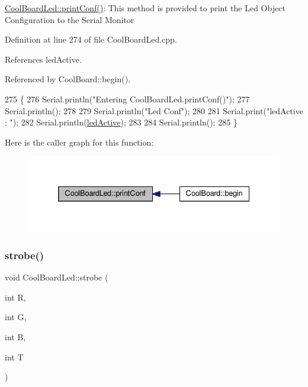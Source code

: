 \hyperlink{classCoolBoardLed_a8ed3053a36f0ed4a131f43b5b17efb61}{Cool\+Board\+Led\+::print\+Conf()}\+: This method is provided to print the Led Object Configuration to the Serial Monitor 

Definition at line 274 of file Cool\+Board\+Led.\+cpp.



References led\+Active.



Referenced by Cool\+Board\+::begin().


\begin{DoxyCode}
275 \{
276     Serial.println(\textcolor{stringliteral}{"Entering CoolBoardLed.printConf()"});
277     Serial.println();
278 
279     Serial.println(\textcolor{stringliteral}{"Led Conf"});
280 
281     Serial.print(\textcolor{stringliteral}{"ledActive : "});
282     Serial.println(\hyperlink{classCoolBoardLed_a5f17c135516fcf4b44ea8a096ba0177a}{ledActive});
283 
284     Serial.println();   
285 \}
\end{DoxyCode}
Here is the caller graph for this function\+:\nopagebreak
\begin{figure}[H]
\begin{center}
\leavevmode
\includegraphics[width=332pt]{classCoolBoardLed_a8ed3053a36f0ed4a131f43b5b17efb61_icgraph}
\end{center}
\end{figure}
\mbox{\label{classCoolBoardLed_adc08c0ac07473499971c503d300f0413}} 
\subsubsection{\texorpdfstring{strobe()}{strobe()}}
{\footnotesize\ttfamily void Cool\+Board\+Led\+::strobe (\begin{DoxyParamCaption}\item[{int}]{R,  }\item[{int}]{G,  }\item[{int}]{B,  }\item[{int}]{T }\end{DoxyParamCaption})}

